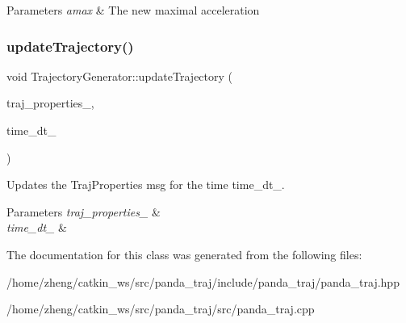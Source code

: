\begin{DoxyParams}{Parameters}
{\em amax} & The new maximal acceleration \\
\hline
\end{DoxyParams}
\mbox{\label{class_trajectory_generator_af27180af44e99c60c5750e8b2444098f}} 
\subsubsection{\texorpdfstring{update\+Trajectory()}{updateTrajectory()}}
{\footnotesize\ttfamily void Trajectory\+Generator\+::update\+Trajectory (\begin{DoxyParamCaption}\item[{panda\+\_\+traj\+::\+Traj\+Properties}]{traj\+\_\+properties\+\_\+,  }\item[{double}]{time\+\_\+dt\+\_\+ }\end{DoxyParamCaption})}



Updates the Traj\+Properties msg for the time time\+\_\+dt\+\_\+. 


\begin{DoxyParams}{Parameters}
{\em traj\+\_\+properties\+\_\+} & \\
\hline
{\em time\+\_\+dt\+\_\+} & \\
\hline
\end{DoxyParams}


The documentation for this class was generated from the following files\+:\begin{DoxyCompactItemize}
\item 
/home/zheng/catkin\+\_\+ws/src/panda\+\_\+traj/include/panda\+\_\+traj/panda\+\_\+traj.\+hpp\item 
/home/zheng/catkin\+\_\+ws/src/panda\+\_\+traj/src/panda\+\_\+traj.\+cpp\end{DoxyCompactItemize}
